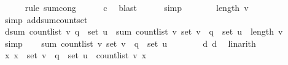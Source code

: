 \begin{isabellebody}
\ \ \ \ \isamarkupfalse%
\ {\isacharparenleft}{\kern0pt}rule\ sum{\isachardot}{\kern0pt}cong{\isacharparenright}{\kern0pt}\isanewline
\ \ \ \ \isamarkupfalse%
\ c\ \isamarkupfalse%
\ blast\isanewline
\ \ \ \ \isamarkupfalse%
\ simp\isanewline
\ \ \isamarkupfalse%
\ \isamarkupfalse%
\ {\isachardoublequoteopen}{\isachardot}{\kern0pt}{\isachardot}{\kern0pt}{\isachardot}{\kern0pt}\ {\isacharequal}{\kern0pt}\ length\ v{\isachardoublequoteclose}\isanewline
\ \ \ \ \isamarkupfalse%
\ {\isacharparenleft}{\kern0pt}simp\ add{\isacharcolon}{\kern0pt}sum{\isacharunderscore}{\kern0pt}count{\isacharunderscore}{\kern0pt}set{\isacharparenright}{\kern0pt}\isanewline
\ \ \isamarkupfalse%
\ \isamarkupfalse%
\ d{\isacharunderscore}{\kern0pt}{}{\isacharcolon}{\kern0pt}{\isachardoublequoteopen}sum\ {\isacharparenleft}{\kern0pt}count{\isacharunderscore}{\kern0pt}list\ v{\isacharparenright}{\kern0pt}\ {\isacharparenleft}{\kern0pt}q\ {\isacharbackquote}{\kern0pt}\ set\ u{\isacharparenright}{\kern0pt}\ {\isacharplus}{\kern0pt}\ sum\ {\isacharparenleft}{\kern0pt}count{\isacharunderscore}{\kern0pt}list\ v{\isacharparenright}{\kern0pt}\ {\isacharparenleft}{\kern0pt}set\ v\ {\isacharminus}{\kern0pt}\ {\isacharparenleft}{\kern0pt}q\ {\isacharbackquote}{\kern0pt}\ set\ u{\isacharparenright}{\kern0pt}{\isacharparenright}{\kern0pt}\ {\isacharequal}{\kern0pt}\ length\ v{\isachardoublequoteclose}\ \isamarkupfalse%
\ simp\isanewline
\isanewline
\ \ \isamarkupfalse%
\ {\isachardoublequoteopen}sum\ {\isacharparenleft}{\kern0pt}count{\isacharunderscore}{\kern0pt}list\ v{\isacharparenright}{\kern0pt}\ {\isacharparenleft}{\kern0pt}set\ v\ {\isacharminus}{\kern0pt}\ {\isacharparenleft}{\kern0pt}q\ {\isacharbackquote}{\kern0pt}\ set\ u{\isacharparenright}{\kern0pt}{\isacharparenright}{\kern0pt}\ {\isacharequal}{\kern0pt}\ {}{\isachardoublequoteclose}\isanewline
\ \ \ \ \isamarkupfalse%
\ d{\isacharunderscore}{\kern0pt}{}\ d{\isacharunderscore}{\kern0pt}{}\ \isamarkupfalse%
\ linarith\isanewline
\isanewline
\ \ \isamarkupfalse%
\ {\isachardoublequoteopen}{\isasymAnd}x{\isachardot}{\kern0pt}\ x\ {\isasymin}\ {\isacharparenleft}{\kern0pt}set\ v\ {\isacharminus}{\kern0pt}\ {\isacharparenleft}{\kern0pt}q\ {\isacharbackquote}{\kern0pt}\ set\ u{\isacharparenright}{\kern0pt}{\isacharparenright}{\kern0pt}\ {\isasymLongrightarrow}\ count{\isacharunderscore}{\kern0pt}list\ v\ x\ {\isasymle}\ {}{\isachardoublequoteclose}\isanewline

\end{isabellebody}

